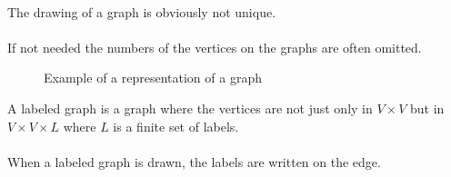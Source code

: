 \paragraph{}
The drawing of a graph is obviously not unique.

\paragraph{}
If not needed the numbers of the vertices on the graphs are often omitted.


\begin{figure}[H]
  \begin{center}
    \caption{Example of a representation of a graph}
  \end{center}
\end{figure}

\begin{definition}
  A labeled graph is a graph where the vertices are not just only in $V \times V$ but in $V \times V \times L$ where $L$ is a finite set of labels.
\end{definition}

\paragraph{}
When a labeled graph is drawn, the labels are written on the edge.

